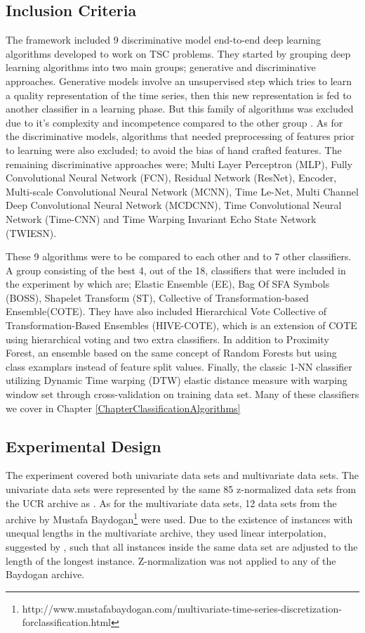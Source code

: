 \subsection{Inclusion Criteria}
\label{subsectionDeepLearningReviewInclusion}
The framework included 9 discriminative model end-to-end deep learning algorithms developed to work on TSC problems.
They started by grouping deep learning algorithms into two main groups; generative and discriminative approaches.
Generative models involve an unsupervised step which tries to learn a quality representation of the time series, then this new representation is fed to another classifier in a learning phase.
But this family of algorithms was excluded due to it's complexity and incompetence compared to the other group \cite{le2017time,bagnall2017great}.
As for the discriminative models, algorithms that needed preprocessing of features prior to learning were also excluded; to avoid the bias of hand crafted features.
The remaining discriminative approaches were; Multi Layer Perceptron (MLP), Fully Convolutional Neural Network (FCN), Residual Network (ResNet), Encoder, Multi-scale Convolutional Neural Network (MCNN),
Time Le-Net, Multi Channel Deep Convolutional Neural Network (MCDCNN), Time Convolutional Neural Network (Time-CNN) and Time Warping Invariant Echo State Network (TWIESN).

These 9 algorithms were to be compared to each other and to 7 other classifiers.
A group consisting of the best 4, out of the 18, classifiers that were included in the experiment by \cite{bagnall2017great} which are; Elastic Ensemble (EE), Bag Of SFA Symbols (BOSS), Shapelet Transform (ST), Collective of Transformation-based Ensemble(COTE).
They have also included Hierarchical Vote Collective of Transformation-Based Ensembles (HIVE-COTE), which is an extension of COTE using hierarchical voting and two extra classifiers.
In addition to Proximity Forest, an ensemble based on the same concept of Random Forests but using class examplars instead of feature split values.
Finally, the classic 1-NN classifier utilizing Dynamic Time warping (DTW) elastic distance measure with warping window set through cross-validation on training data set.
Many of these classifiers we cover in Chapter \ref{ChapterClassificationAlgorithms}

\subsection{Experimental Design}
\label{subsectionDeepLearningReviewExperiment}
The experiment covered both univariate data sets and multivariate data sets. The univariate data sets were represented by the same 85 z-normalized data sets from the UCR archive as \cite{bagnall2017great}.
As for the multivariate data sets, 12 data sets from the archive by Mustafa Baydogan\footnote{http://www.mustafabaydogan.com/multivariate-time-series-discretization-forclassification.html}
were used. Due to the existence of instances with unequal lengths in the multivariate archive, they used linear interpolation, suggested by \cite{ratanamahatana2005three},
such that all instances inside the same data set are adjusted to the length of the longest instance. Z-normalization was not applied to any of the Baydogan archive.

